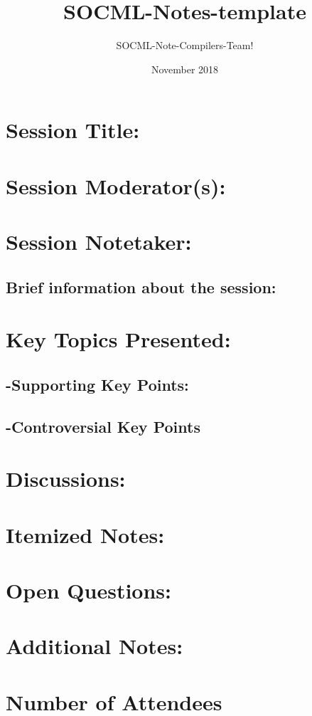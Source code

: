 \documentclass{article}
\title{SOCML-Notes-template}
\author{SOCML-Note-Compilers-Team!}
\date{November 2018}
\begin{document}
\maketitle

\section{Session Title:}

\section{Session Moderator(s):}
\section{Session Notetaker:}

\subsection{Brief information about the session:}
\section{Key Topics Presented:}
\subsection{-Supporting Key Points:}


\subsection{-Controversial Key Points}

\section{Discussions:}

\section{Itemized Notes:}

\section{Open Questions:}

\section{Additional Notes:}

\section{Number of Attendees}
\end{document}
